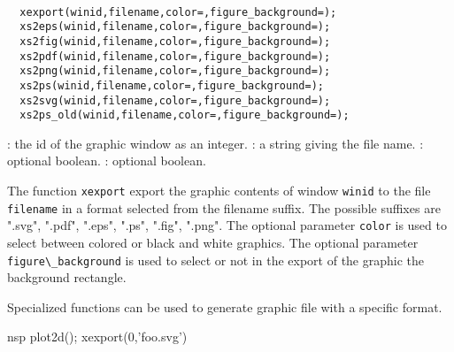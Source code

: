 \begin{mandesc}
  \\
\end{mandesc}
\begin{calling_sequence}
\begin{verbatim}
  xexport(winid,filename,color=,figure_background=);
  xs2eps(winid,filename,color=,figure_background=);
  xs2fig(winid,filename,color=,figure_background=);
  xs2pdf(winid,filename,color=,figure_background=);
  xs2png(winid,filename,color=,figure_background=);
  xs2ps(winid,filename,color=,figure_background=);
  xs2svg(winid,filename,color=,figure_background=);
  xs2ps_old(winid,filename,color=,figure_background=);
\end{verbatim}
\end{calling_sequence}
\begin{parameters}
  \begin{varlist}
    : the id of the graphic window as an integer.
    : a string giving the file name.
    : optional boolean.
    : optional boolean.
  \end{varlist}
\end{parameters}
\begin{mandescription}
  The function \verb!xexport! export the graphic contents of window \verb!winid! to
  the file \verb!filename! in a format selected from the filename suffix.
  The possible suffixes are ".svg", ".pdf", ".eps", ".ps", ".fig", ".png".
  The optional parameter \verb!color! is used to select between colored or black and
  white graphics. The optional parameter \verb!figure\_background! is used to select
  or not in the export of the graphic the background rectangle.

  Specialized functions can be used to generate graphic file with a specific format.
\end{mandescription}
\begin{examples}
  \begin{mintednsp}{nsp}
    plot2d();
    xexport(0,'foo.svg')
  \end{mintednsp}
\end{examples}
